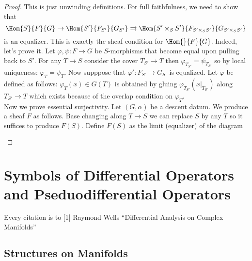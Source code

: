 \documentclass[12pt]{article}
\theoremstyle{plain}
\begin{document}
\begin{proof}
This is just unwinding definitions. For full faithfulness, we need to show that
\[ \Hom{S}{F}{G} \to \Hom{S'}{F_{S'}}{G_{S'}} \rightrightarrows \Hom{S' \times_S S'}{F_{S' \times_S S'}}{G_{S' \times_S S'}} \]
is an equalizer. This is exactly the sheaf condition for $\Hom{}{F}{G}$. Indeed, let's prove it. Let $\varphi, \psi : F \to G$ be $S$-morphisms that become equal upon pulling back to $S'$. For any $T \to S$ consider the cover $T_{S'} \to T$ then $\varphi_{T_{S'}} = \psi_{T_{S'}}$ so by local uniqueness: $\varphi_T = \psi_T$. Now supppose that $\varphi' : F_{S'} \to G_{S'}$ is equalized. Let $\varphi$ be defined as follows: $\varphi_T(x) \in G(T)$ is obtained by gluing $\varphi_{T_{S'}}(x|_{T_{S'}})$ along $T_{S'} \to T$ which exists because of the overlap condition on $\varphi_T$.
\bigskip\\
Now we prove essential surjectivity. Let $(G, \alpha)$ be a descent datum. We produce a sheaf $F$ as follows. Base changing along $T \to S$ we can replace $S$ by any $T$ so it suffices to produce $F(S)$. Define $F(S)$ as the limit (equalizer) of the diagram
\begin{center}
\end{center}
\end{proof}
 
\section{Symbols of Differential Operators and Pseduodifferential Operators}

\newcommand{\cS}{\mathcal{S}}
\newcommand{\inner}[2]{\left< #1, #2 \right>}
\newcommand{\OP}{\mathrm{OP}}
\renewcommand{\Diff}{\mathrm{Diff}}


Every citation is to [1] Raymond Wells ``Differential Analysis on Complex Manifolds''

\subsection{Structures on Manifolds}
\end{document}
